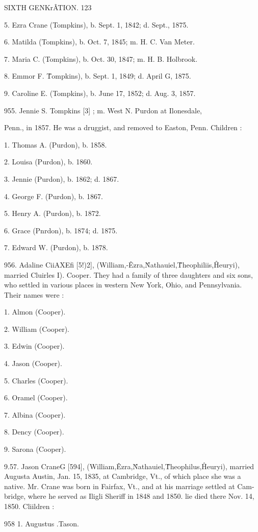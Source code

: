 SIXTH GENKr\^ATION. 123 

5. Ezra Crane (Tompkins), b. Sept. 1, 1842; d. Sept., 1875. 

6. Matilda (Tompkins), b. Oct. 7, 1845; m. H. C. Van Meter. 

7. Maria C. (Tompkins), b. Oct. 30, 1847; m. H. B. Holbrook. 

8. Emmor F. \^Tompkins), b. Sept. 1, 1849; d. April G, 1875. 

9. Caroline E. (Tompkins), b. June 17, 1852; d. Aug. 3, 1857. 

955. Jennie S. Tompkins [3] ; m. West N. Purdon at Ilonesdale, 

Penn., in 1857. He was a druggist, and removed to Easton, 
Penn. Children : 

1. Thomas A. (Purdon), b. 1858. 

2. Louisa (Purdon), b. 1860. 

3. Jennie (Purdon), b. 1862; d. 1867. 

4. George F. (Purdon), b. 1867. 

5. Henry A. (Purdon), b. 1872. 

6. Grace (Pnrdon), b. 1874; d. 1875. 

7. Edward W. (Purdon), b. 1878. 

956. Adaline CiiAXEfi [5!)2], (William,-\^ Ezra,\^ Nathauiel,\^ 
Theophiliis,\^ Heuryi), married Cluirles I). Cooper. They had a 
family of three daughters and six sons, who settled in various 
places in western New York, Ohio, and Pennsylvania. Their 
names were : 

1. Almon (Cooper). 

2. William (Cooper). 

3. Edwin (Cooper). 

4. Jason (Cooper). 

5. Charles (Cooper). 

6. Oramel (Cooper). 

7. Albina (Cooper). 

8. Dency (Cooper). 

9. Sarona (Cooper). 

9.57. Jason CraneG [594], (William,\^ Ezra,\^ Nathauiel,\^ 
Theophilus,\^ Heuryi), married Augusta Austin, Jan. 15, 1835, 
at Cambridge, Vt., of which place she was a native. Mr. Crane 
was born in Fairfax, Vt., and at his marriage settled at Cam- 
bridge, where he served as Iligli Sheriff in 1848 and 1850. lie 
died there Nov. 14, 1850. Cliildren : 

958  1. Augustus .Tason. 

